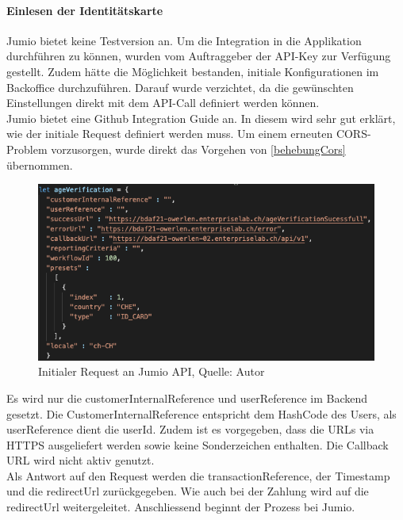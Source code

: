 \paragraph{Einlesen der Identitätskarte}
Jumio bietet keine Testversion an. Um die Integration in die Applikation durchführen zu können, wurden vom Auftraggeber der API-Key zur Verfügung gestellt. Zudem hätte die Möglichkeit bestanden, initiale Konfigurationen im Backoffice durchzuführen. Darauf wurde verzichtet, da die gewünschten Einstellungen direkt mit dem API-Call definiert werden können. \\
Jumio bietet eine \gls{Github} Integration Guide an. In diesem wird sehr gut erklärt, wie der initiale Request definiert werden muss. Um einem erneuten \ac{CORS}-Problem vorzusorgen, wurde direkt das Vorgehen von \ref{behebungCors} übernommen. \\

 \begin{figure}[H]
	\centering
	\includegraphics[scale=0.5]{images/initRequestJumio.PNG}
	\caption[Initialer Request an Jumio API]{Initialer Request an Jumio API, Quelle: Autor}
	\label{img: jumioInitialRequest}
\end{figure} 

Es wird nur die \glqq customerInternalReference\grqq{} und \glqq userReference\grqq{} im Backend gesetzt. Die CustomerInternalReference entspricht dem HashCode des Users, als userReference dient die userId. Zudem ist es vorgegeben, dass die \ac{URL}s via \ac{HTTPS} ausgeliefert werden sowie keine Sonderzeichen enthalten. Die Callback URL wird nicht aktiv genutzt. \\

Als Antwort auf den Request werden die transactionReference, der Timestamp und die redirectUrl zurückgegeben. Wie auch bei der Zahlung wird auf die redirectUrl weitergeleitet. Anschliessend beginnt der Prozess bei Jumio.

